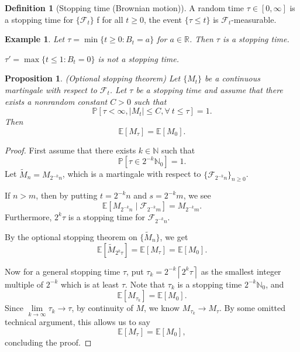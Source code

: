 \documentclass{tufte-handout}
\newcommand*\N{\mathbb{N}}
\newcommand*\R{\mathbb{R}}
\newcommand*\E{\mathbb{E}}
\renewcommand*\P{\mathbb{P}}
\newtheorem{ex}[thm]{Example}
\newtheorem{prop}[thm]{Proposition}
\theoremstyle{definition}
\newtheorem{defn}[thm]{Definition}
\begin{document}
\begin{defn}[Stopping time (Brownian motion)]
A random time $\tau \in [0,\infty]$ is a stopping time for $\{\mathscr{F}_t\}$ f for all $t \ge 0$, the event $\{\tau \le t\}$ is $\mathscr{F}_t$-measurable.
\end{defn}

\begin{ex}
	Let $\tau = \min \{t\ge 0 : B_t = a\}$ for $a \in \R$. Then $\tau$ is a stopping time. 

	$\tau' = \max \{t\le 1 : B_t = 0 \}$ is not a stopping time.
\end{ex}
\begin{prop}
	(Optional stopping theorem) Let $\{M_t\}$ be a continuous martingale with respect to $\mathscr{F}_t$. Let $\tau$ be a stopping time and assume that there exists a nonrandom constant $C > 0$ such that \[
		\P\left[\tau < \infty, \left| M_t \right|\le C, \forall\ t \le \tau\right] = 1
	.\] Then \[
		\E\left[M_\tau\right] = \E\left[M_0\right] 
	.\] 
\end{prop}

\begin{proof}
	First assume that there exists $k \in \N$ such that \[
		\P\left[\tau \in 2^{-k} \N_0\right] = 1
	.\] Let $\tilde{M}_n = M_{2^{-k} n}$, which is a martingale with respect to $\{\mathscr{F}_{2^{-k}n}\}_{n \ge 0}$.

	If $n > m$, then by putting $t = 2^{-k}n$ and $s = 2^{-k}m$, we see \[
		\E\left[M_{2^{-k}n} \mid \mathscr{F}_{2^{-k}m}\right] = M_{2^{-k}m}
	.\] Furthermore, $2^{k}\tau$\marginnote{Since $\tau \in 2^{-k}\N_0$, $2^k \tau \in N_0$.} is a stopping time for $\mathscr{F}_{2^{-k}n}$.

	By the optional stopping theorem on $\{\tilde{M}_n\}$, we get \[
		\E\left[\tilde{M}_{2^k \tau}\right] = \E\left[M_\tau\right]  = \E\left[M_0\right] 
	.\] 

	Now for a general stopping time $\tau$, put $\tau_k = 2^{-k} \left\lceil 2^{k}\tau \right\rceil $ as the smallest integer multiple of $2^{-k}$ which is at least $\tau$. Note that $\tau_k$ is a stopping time $2^{-k}\N_0$, and \[
		\E\left[M_{\tau_k}\right] = \E\left[M_0\right] 
	.\] Since $\lim\limits_{k \to \infty} \tau_k \to \tau$, by continuity of $M$, we know $M_{\tau_k} \to M_\tau$. By some omitted technical argument, this allows us to say \[
		\E\left[M_\tau\right] = \E\left[M_0\right] 
	,\] concluding the proof.
\end{proof}
\end{document}
